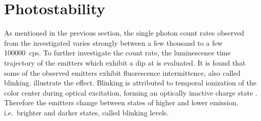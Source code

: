 
	\section{Photostability} \label{subsec::photostab}

		As mentioned in the previous section, the single photon count rates observed from the investigated \sivs varies strongly between a few thousand to a few \SI{100000}{cps}.
		To further investigate the count rate, the luminescence time trajectory of the emitters which exhibit a dip at \gtz is evaluated.
		It is found that some of the observed emitters exhibit fluorescence intermittence, also called blinking.  illustrate the effect.
		Blinking is attributed to temporal ionization of the color center during optical excitation, forming an optically inactive charge state \cite{Jantzen2016,Neu2012a,Gali2013}.
		Therefore the emitters change between states of higher and lower emission, i.e.\ brighter and darker states, called blinking levels.

